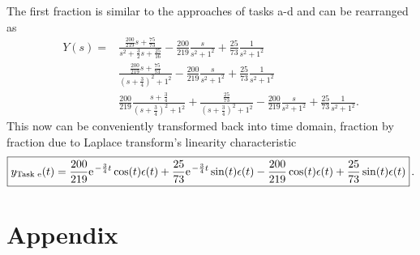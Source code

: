 \documentclass[a4paper,11pt,oneside]{scrartcl}
\begin{document}
%
The first fraction is similar to the approaches of tasks a-d and can be
rearranged as
\begin{align}
Y(s) = &
\frac{\frac{200}{219} s + \frac{75}{73}}{s^2 + \frac{3}{2} s + \frac{25}{16}}
-\frac{200}{219}\frac{s}{s^2+1^2}
+\frac{25}{73}\frac{1}{s^2+1^2}\\
&
\frac{\frac{200}{219} s + \frac{75}{73}}{(s + \frac{3}{4})^2 + 1^2}
-\frac{200}{219}\frac{s}{s^2+1^2}
+\frac{25}{73}\frac{1}{s^2+1^2}\\
&
\frac{200}{219} \frac{s + \frac{3}{4}}{(s + \frac{3}{4})^2 + 1^2}+
\frac{\frac{25}{73}}{(s + \frac{3}{4})^2 + 1^2}
-\frac{200}{219}\frac{s}{s^2+1^2}
+\frac{25}{73}\frac{1}{s^2+1^2}.
\end{align}
This now can be conveniently transformed back into time domain, fraction by fraction
due to Laplace transform's linearity characteristic
\begin{align}
\boxed{
  y_\text{Task e}(t) =
  \frac{200}{219} \e^{-\frac{3}{4} t} \cos(t) \epsilon(t)+
  \frac{25}{73} \e^{-\frac{3}{4} t} \sin(t) \epsilon(t)-
  \frac{200}{219} \cos(t) \epsilon(t) +
  \frac{25}{73} \sin(t) \epsilon(t)}\,.
\end{align}


\newpage
\section*{Appendix}

\end{document}
